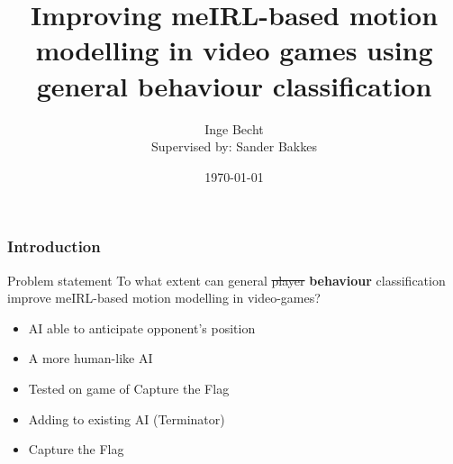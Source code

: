 \documentclass{beamer}
\title[Improving meIRL-based motion modelling]{Improving meIRL-based motion modelling in video
games using general behaviour classification}
\author[Inge Becht]{\large{Inge Becht}\\{\small Supervised by: Sander Bakkes}}
\institute[Universiteit van Amsterdam]
{\large Universiteit van Amsterdam}
\date{\today}
\begin{document}
\begin{frame}
    \titlepage
\end{frame}

\begin{frame}
    \frametitle{Introduction}
    \begin{block}{Problem statement}
        To what extent can general \st{player} \textbf{behaviour} classification improve meIRL-based motion modelling
        in video-games?
    \end{block}
    \begin{itemize}
        \item AI able to anticipate opponent's position
        \item A more human-like AI
        \item Tested on game of Capture the Flag
        \item Adding to existing AI (Terminator)
        \item Capture the Flag
   \end{itemize}
\end{frame}
\end{document}
